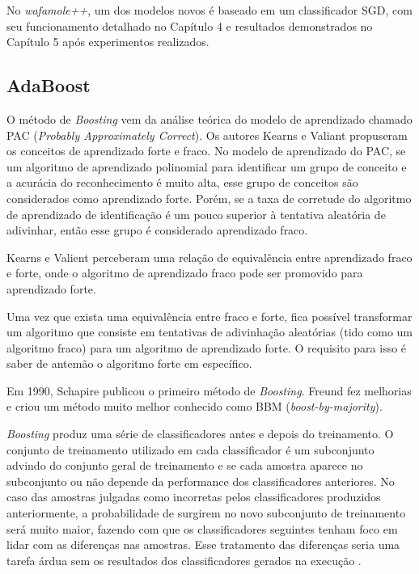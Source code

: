 No \textit{wafamole++}, um dos modelos novos é baseado em um classificador SGD, com seu funcionamento detalhado no Capítulo 4 e resultados demonstrados no Capítulo 5 após experimentos realizados.


\bigskip

\subsection{AdaBoost}

O método de \textit{Boosting} vem da análise teórica do modelo de aprendizado chamado PAC (\textit{Probably Approximately Correct}). Os autores Kearns e Valiant propuseram os conceitos de aprendizado forte e fraco. No modelo de aprendizado do PAC, se um algoritmo de aprendizado polinomial para identificar um grupo de conceito e a acurácia do reconhecimento é muito alta, esse grupo de conceitos são considerados como aprendizado forte. Porém, se a taxa de corretude do algoritmo de aprendizado de identificação é um pouco superior à tentativa aleatória de adivinhar, então esse grupo é considerado aprendizado fraco. 

Kearns e Valient perceberam uma relação de equivalência entre aprendizado fraco e forte, onde o algoritmo de aprendizado fraco pode ser promovido para aprendizado forte.

Uma vez que exista uma equivalência entre fraco e forte, fica possível transformar um algoritmo que consiste em tentativas de adivinhação aleatórias (tido como um algoritmo fraco) para um algoritmo de aprendizado forte. O requisito para isso é saber de antemão o algoritmo forte em específico.

Em 1990, Schapire publicou o primeiro método de \textit{Boosting}. Freund fez melhorias e criou um método muito melhor conhecido como BBM (\textit{boost-by-majority}).

\textit{Boosting} produz uma série de classificadores antes e depois do treinamento. O conjunto de treinamento utilizado em cada classificador é um subconjunto advindo do conjunto geral de treinamento e se cada amostra aparece no subconjunto ou não depende da performance dos classificadores anteriores. No caso das amostras julgadas como incorretas pelos classificadores produzidos anteriormente, a probabilidade de surgirem no novo subconjunto de treinamento será muito maior, fazendo com que os classificadores seguintes tenham foco em lidar com as diferenças nas amostras. Esse tratamento das diferenças seria uma tarefa árdua sem os resultados dos classificadores gerados na execução \cite{wu2011some}.

